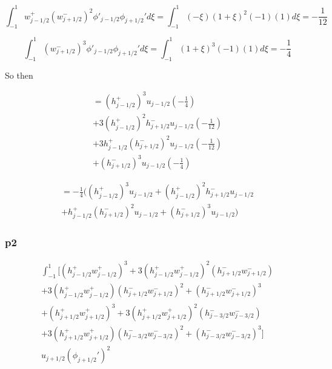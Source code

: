 \documentclass[12pt]{article}
\begin{document}
\[\int_{-1}^{1}w^+_{j - 1/2}\left(w^-_{j + 1/2}\right)^2\phi'_{j - 1/2} \phi_{j+1/2}' d\xi = \int_{-1}^{1}(-\xi)\left(1 + \xi\right)^2(-1) (1) d\xi =  - \frac{1}{12}\]

\[\int_{-1}^{1}\left(w^-_{j + 1/2}\right)^3\phi'_{j - 1/2}\phi_{j+1/2}' d\xi = \int_{-1}^{1}\left(1 + \xi\right)^3(-1)(1) d\xi = -\frac{1}{4} \]

So then 

\begin{multline}
= \left(h^+_{j- 1/2}\right)^3u_{j- 1/2}(-\frac{1}{4})\\  + 3 \left(h^+_{j- 1/2}\right)^2h^-_{j+ 1/2} u_{j- 1/2}(- \frac{1}{12}) \\ + 3h^+_{j- 1/2}\left(h^-_{j+ 1/2}\right)^2u_{j- 1/2} (- \frac{1}{12}) \\+\left(h^-_{j+ 1/2}\right)^3u_{j- 1/2}(-\frac{1}{4})
\end{multline}

\begin{multline}
= -\frac{1}{4}\bigg( \left(h^+_{j- 1/2}\right)^3u_{j- 1/2} + \left(h^+_{j- 1/2}\right)^2h^-_{j+ 1/2} u_{j- 1/2} \\ + h^+_{j- 1/2}\left(h^-_{j+ 1/2}\right)^2u_{j- 1/2} +\left(h^-_{j+ 1/2}\right)^3u_{j- 1/2} \bigg)
\end{multline}

\subsubsection{p2}

\begin{multline}
\int_{-1}^{1}\bigg[ \left(h^+_{j- 1/2}w^+_{j - 1/2}\right)^3 + 3 \left(h^+_{j- 1/2}w^+_{j - 1/2}\right)^2\left(h^-_{j+ 1/2}w^-_{j + 1/2}\right) \\ + 3\left(h^+_{j- 1/2}w^+_{j - 1/2}\right)\left(h^-_{j+ 1/2}w^-_{j + 1/2}\right)^2 +\left(h^-_{j+ 1/2}w^-_{j + 1/2}\right)^3  \\ + \left(h^+_{j+ 1/2}w^+_{j + 1/2}\right)^3 + 3\left(h^+_{j+ 1/2}w^+_{j + 1/2}\right)^2\left(h^-_{j- 3/2}w^-_{j - 3/2}\right) \\ + 3\left(h^+_{j+ 1/2}w^+_{j + 1/2}\right) \left(h^-_{j- 3/2}w^-_{j - 3/2}\right)^2 + \left(h^-_{j- 3/2}w^-_{j - 3/2}\right)^3  \bigg] \\ u_{j+1/2}\left(\phi_{j+1/2}'\right)^2
\end{multline}
\end{document}
